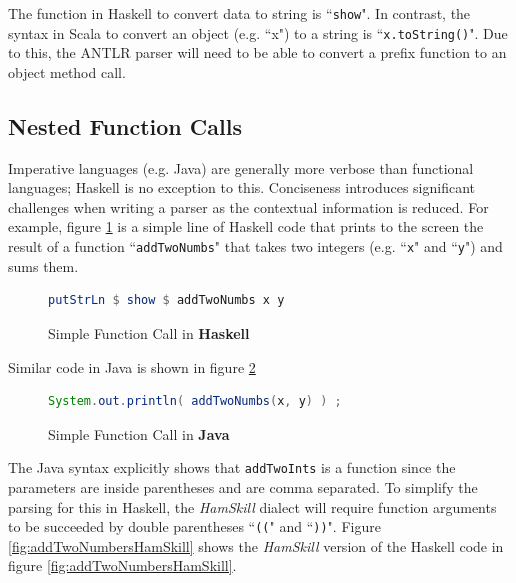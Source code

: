 \documentclass{report}
\begin{document}
The function in Haskell to convert data to string is ``{\tt show}". In contrast, the syntax in Scala to convert an object (e.g. ``x") to a string is ``{\tt x.toString()}".  Due to this, the ANTLR parser will need to be able to convert a prefix function to an object method call.

\subsection{Nested Function Calls}\label{sec:nestedFunctionCalls}

Imperative languages (e.g. Java) are generally more verbose than functional languages; Haskell is no exception to this.  Conciseness introduces significant challenges when writing a parser as the contextual information is reduced.  For example, figure \ref{fig:addTwoNumbersHaskell} is a simple line of Haskell code that prints to the screen the result of a function ``{\tt addTwoNumbs}" that takes two integers (e.g. ``{\tt x}" and ``{\tt y}") and sums them. 

\begin{figure}[H]
\begin{mdframed}
\begin{lstlisting}[language=Haskell]
putStrLn $ show $ addTwoNumbs x y
\end{lstlisting}
\end{mdframed}
\caption{Simple Function Call in \textbf{Haskell}}\label{fig:addTwoNumbersHaskell}
\end{figure}

Similar code in Java is shown in figure \ref{fig:addTwoNumbersJava}

\begin{figure}[H]
\begin{mdframed}
\begin{lstlisting}[language=Java]
System.out.println( addTwoNumbs(x, y) ) ;
\end{lstlisting}
\end{mdframed}
\caption{Simple Function Call in \textbf{Java}}\label{fig:addTwoNumbersJava}
\end{figure}

The Java syntax explicitly shows that {\tt addTwoInts} is a function since the parameters are inside parentheses and are comma separated.  To simplify the parsing for this in Haskell, the \emph{HamSkill} dialect will require function arguments to be succeeded by double parentheses ``{\tt ((}" and ``{\tt ))}".  Figure \ref{fig:addTwoNumbersHamSkill} shows the \emph{HamSkill} version of the Haskell code in figure \ref{fig:addTwoNumbersHamSkill}.
\end{document}
